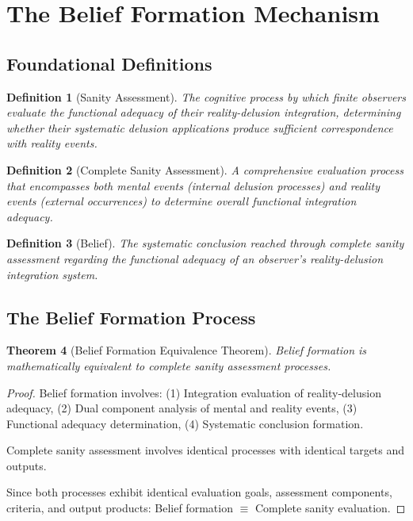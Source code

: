 \documentclass[12pt,a4paper]{article}
\newtheorem{theorem}{Theorem}[section]
\newtheorem{definition}[theorem]{Definition}
\begin{document}
\section{The Belief Formation Mechanism}

\subsection{Foundational Definitions}

\begin{definition}[Sanity Assessment]
The cognitive process by which finite observers evaluate the functional adequacy of their reality-delusion integration, determining whether their systematic delusion applications produce sufficient correspondence with reality events.
\end{definition}

\begin{definition}[Complete Sanity Assessment]
A comprehensive evaluation process that encompasses both mental events (internal delusion processes) and reality events (external occurrences) to determine overall functional integration adequacy.
\end{definition}

\begin{definition}[Belief]
The systematic conclusion reached through complete sanity assessment regarding the functional adequacy of an observer's reality-delusion integration system.
\end{definition}

\subsection{The Belief Formation Process}

\begin{theorem}[Belief Formation Equivalence Theorem]
Belief formation is mathematically equivalent to complete sanity assessment processes.
\end{theorem}

\begin{proof}
Belief formation involves: (1) Integration evaluation of reality-delusion adequacy, (2) Dual component analysis of mental and reality events, (3) Functional adequacy determination, (4) Systematic conclusion formation.

Complete sanity assessment involves identical processes with identical targets and outputs.

Since both processes exhibit identical evaluation goals, assessment components, criteria, and output products:
Belief formation $\equiv$ Complete sanity evaluation.
\end{proof}
\end{document}
